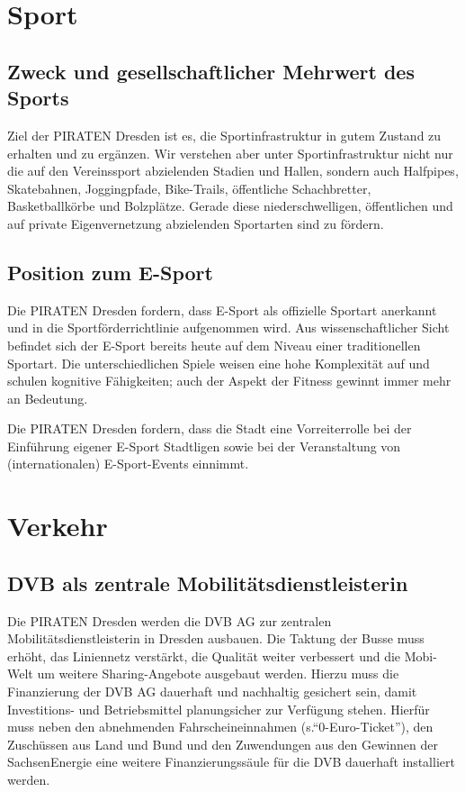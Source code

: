 \documentclass[a4paper, 11pt]{article}
\begin{document}
\section{Sport}

\subsection{Zweck und gesellschaftlicher Mehrwert des Sports}
Ziel der PIRATEN Dresden ist es, die Sportinfrastruktur in gutem Zustand zu erhalten und zu ergänzen. Wir verstehen aber unter Sportinfrastruktur nicht nur die auf den Vereinssport abzielenden Stadien und Hallen, sondern auch Halfpipes, Skatebahnen, Joggingpfade, Bike-Trails, öffentliche Schachbretter, Basketballkörbe und Bolzplätze. Gerade diese niederschwelligen, öffentlichen und auf private Eigenvernetzung abzielenden Sportarten sind zu fördern.



\subsection{Position zum E-Sport}
Die PIRATEN Dresden fordern, dass E-Sport als offizielle Sportart anerkannt und in die Sportförderrichtlinie aufgenommen wird. Aus wissenschaftlicher Sicht befindet sich der E-Sport bereits heute auf dem Niveau einer traditionellen Sportart. Die unterschiedlichen Spiele weisen eine hohe Komplexität auf und schulen kognitive Fähigkeiten; auch der Aspekt der Fitness gewinnt immer mehr an Bedeutung.\newline

Die PIRATEN Dresden fordern, dass die Stadt eine Vorreiterrolle bei der Einführung eigener E-Sport Stadtligen sowie bei der Veranstaltung von (internationalen) E-Sport-Events einnimmt.


\section{Verkehr}

\subsection{DVB als zentrale Mobilitätsdienstleisterin}
Die PIRATEN Dresden werden die DVB AG zur zentralen Mobilitätsdienstleisterin in Dresden ausbauen. Die Taktung der Busse muss erhöht, das Liniennetz verstärkt, die Qualität weiter verbessert und die Mobi-Welt um weitere Sharing-Angebote ausgebaut werden. Hierzu muss die Finanzierung der DVB AG dauerhaft und nachhaltig gesichert sein, damit Investitions- und Betriebsmittel planungsicher zur Verfügung stehen. Hierfür muss neben den abnehmenden Fahrscheineinnahmen (s.``0-Euro-Ticket''), den Zuschüssen aus Land und Bund und den Zuwendungen aus den Gewinnen der SachsenEnergie eine weitere Finanzierungssäule für die DVB dauerhaft installiert werden.\newline
\end{document}
